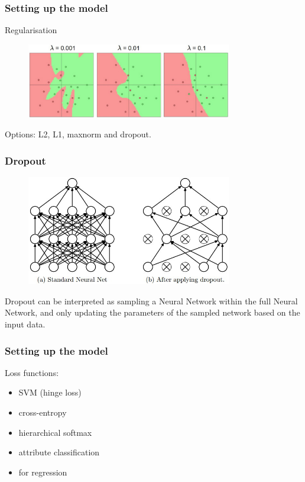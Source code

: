 \begin{frame}
        \frametitle{Setting up the model}

	Regularisation

        \begin{figure}
                \includegraphics[width=0.8\textwidth]{Pics/reg_strengths}
        \end{figure}

        Options: L2, L1, maxnorm and dropout.

\end{frame}

\begin{frame}
	\frametitle{Dropout}

	\begin{figure}
                \includegraphics[width=0.8\textwidth]{Pics/dropout}
        \end{figure}

	Dropout can be interpreted as sampling a Neural Network within the full Neural Network, 
	and only updating the parameters of the sampled network based on the input data. 


\end{frame}


\begin{frame}
        \frametitle{Setting up the model}

        Loss functions:
	\begin{itemize}
                \item SVM (hinge loss)
                \item cross-entropy
                \item hierarchical softmax
                \item attribute classification
		\item for regression
        \end{itemize}

\end{frame}

